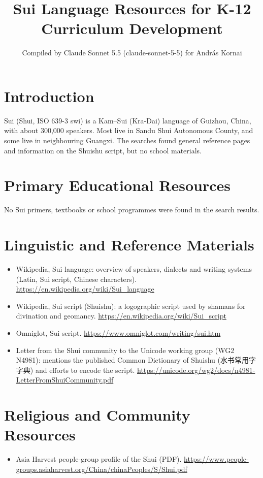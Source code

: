 \documentclass[12pt]{article}
\title{Sui Language Resources for K-12 Curriculum Development}
\author{Compiled by Claude Sonnet 5.5 (claude-sonnet-5-5) for Andr\'as Kornai}
\date{}
\begin{document}
\maketitle

\section{Introduction}
Sui (Shui, ISO 639-3 swi) is a Kam--Sui (Kra-Dai) language of Guizhou, China, with about 300,000 speakers. Most live in Sandu Shui Autonomous County, and some live in neighbouring Guangxi. The searches found general reference pages and information on the Shuishu script, but no school materials.

\section{Primary Educational Resources}
No Sui primers, textbooks or school programmes were found in the search results.

\section{Linguistic and Reference Materials}
\begin{itemize}
\item Wikipedia, Sui language: overview of speakers, dialects and writing systems (Latin, Sui script, Chinese characters). \url{https://en.wikipedia.org/wiki/Sui_language}
\item Wikipedia, Sui script (Shuishu): a logographic script used by shamans for divination and geomancy. \url{https://en.wikipedia.org/wiki/Sui_script}
\item Omniglot, Sui script. \url{https://www.omniglot.com/writing/sui.htm}
\item Letter from the Shui community to the Unicode working group (WG2 N4981): mentions the published Common Dictionary of Shuishu (水书常用字字典) and efforts to encode the script. \url{https://unicode.org/wg2/docs/n4981-LetterFromShuiCommunity.pdf}
\end{itemize}

\section{Religious and Community Resources}
\begin{itemize}
\item Asia Harvest people-group profile of the Shui (PDF). \url{https://www.people-groups.asiaharvest.org/China/chinaPeoples/S/Shui.pdf}
\end{itemize}
\end{document}
